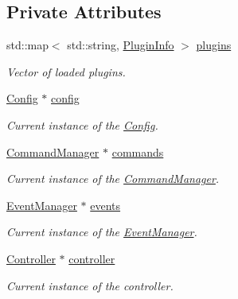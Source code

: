 \subsection*{Private Attributes}
\begin{DoxyCompactItemize}
\item 
\hypertarget{classPluginManager_a4a7dea3948d652d9a4428a237d5af805}{std\-::map$<$ std\-::string, \hyperlink{structPluginInfo}{Plugin\-Info} $>$ \hyperlink{classPluginManager_a4a7dea3948d652d9a4428a237d5af805}{plugins}}\label{classPluginManager_a4a7dea3948d652d9a4428a237d5af805}

\begin{DoxyCompactList}\small\item\em Vector of loaded plugins. \end{DoxyCompactList}\item 
\hypertarget{classPluginManager_a185603a6a022cef13ca60454c80ae4c4}{\hyperlink{classConfig}{Config} $\ast$ \hyperlink{classPluginManager_a185603a6a022cef13ca60454c80ae4c4}{config}}\label{classPluginManager_a185603a6a022cef13ca60454c80ae4c4}

\begin{DoxyCompactList}\small\item\em Current instance of the \hyperlink{classConfig}{Config}. \end{DoxyCompactList}\item 
\hypertarget{classPluginManager_a2759d12d4da860a2c5a1dbb7f76a035a}{\hyperlink{classCommandManager}{Command\-Manager} $\ast$ \hyperlink{classPluginManager_a2759d12d4da860a2c5a1dbb7f76a035a}{commands}}\label{classPluginManager_a2759d12d4da860a2c5a1dbb7f76a035a}

\begin{DoxyCompactList}\small\item\em Current instance of the \hyperlink{classCommandManager}{Command\-Manager}. \end{DoxyCompactList}\item 
\hypertarget{classPluginManager_a7966d86165aaa504ae4dd12f084d4cfa}{\hyperlink{classEventManager}{Event\-Manager} $\ast$ \hyperlink{classPluginManager_a7966d86165aaa504ae4dd12f084d4cfa}{events}}\label{classPluginManager_a7966d86165aaa504ae4dd12f084d4cfa}

\begin{DoxyCompactList}\small\item\em Current instance of the \hyperlink{classEventManager}{Event\-Manager}. \end{DoxyCompactList}\item 
\hypertarget{classPluginManager_a3b08105f2c52f52d21d293fe0045ae1f}{\hyperlink{structController}{Controller} $\ast$ \hyperlink{classPluginManager_a3b08105f2c52f52d21d293fe0045ae1f}{controller}}\label{classPluginManager_a3b08105f2c52f52d21d293fe0045ae1f}

\begin{DoxyCompactList}\small\item\em Current instance of the controller. \end{DoxyCompactList}\end{DoxyCompactItemize}



